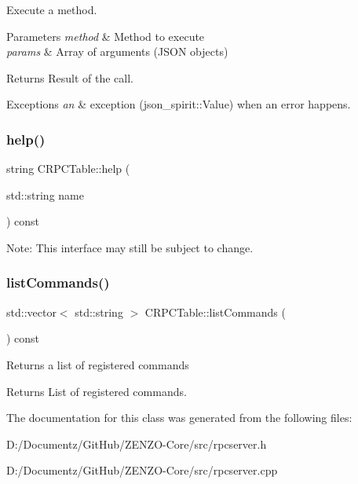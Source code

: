 Execute a method. 
\begin{DoxyParams}{Parameters}
{\em method} & Method to execute \\
\hline
{\em params} & Array of arguments (J\+S\+ON objects) \\
\hline
\end{DoxyParams}
\begin{DoxyReturn}{Returns}
Result of the call. 
\end{DoxyReturn}

\begin{DoxyExceptions}{Exceptions}
{\em an} & exception (json\+\_\+spirit\+::\+Value) when an error happens. \\
\hline
\end{DoxyExceptions}
\mbox{\label{class_c_r_p_c_table_aaba3a5908a430d07084292d5a894c812}} 
\subsubsection{\texorpdfstring{help()}{help()}}
{\footnotesize\ttfamily string C\+R\+P\+C\+Table\+::help (\begin{DoxyParamCaption}\item[{std\+::string}]{name }\end{DoxyParamCaption}) const}

Note\+: This interface may still be subject to change. \mbox{\label{class_c_r_p_c_table_a7ebce2fd23e8343e42d36a9bcd02de95}} 
\subsubsection{\texorpdfstring{listCommands()}{listCommands()}}
{\footnotesize\ttfamily std\+::vector$<$ std\+::string $>$ C\+R\+P\+C\+Table\+::list\+Commands (\begin{DoxyParamCaption}{ }\end{DoxyParamCaption}) const}

Returns a list of registered commands \begin{DoxyReturn}{Returns}
List of registered commands. 
\end{DoxyReturn}


The documentation for this class was generated from the following files\+:\begin{DoxyCompactItemize}
\item 
D\+:/\+Documentz/\+Git\+Hub/\+Z\+E\+N\+Z\+O-\/\+Core/src/rpcserver.\+h\item 
D\+:/\+Documentz/\+Git\+Hub/\+Z\+E\+N\+Z\+O-\/\+Core/src/rpcserver.\+cpp\end{DoxyCompactItemize}
